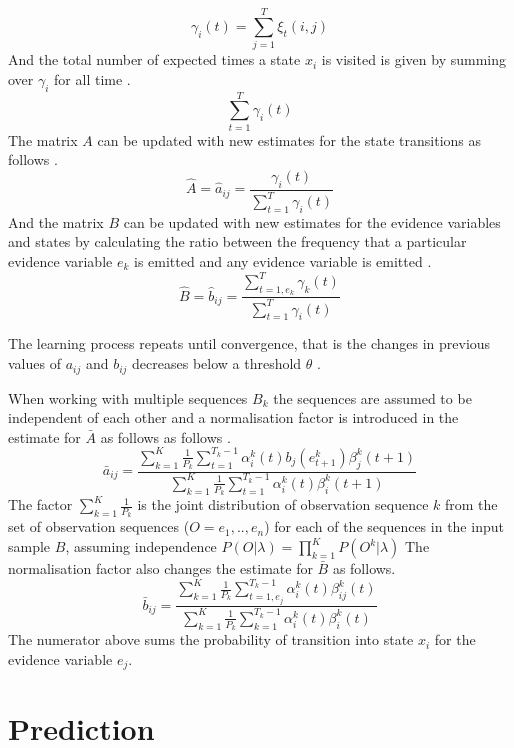 \documentclass[11pt]{article}
\begin{document}
$$
\gamma_i(t) = \sum_{j=1}^T \xi_t(i,j)
$$
And the total number of expected times a state $x_i$ is visited is given by summing over $\gamma_i$ for all time \cite{pc} \cite{rab}.
$$
\sum_{t=1}^T \gamma_i(t)
$$
The matrix $A$ can be updated with new estimates for the state transitions as follows \cite{pc}.
$$
\hat{A} = \hat{a}_{ij} = \frac{\gamma_i(t) }{\sum_{t=1}^T \gamma_i(t)}
$$
And the matrix $B$ can be updated with new estimates for the evidence variables and states by calculating the ratio between the frequency that a particular evidence variable $e_k$ is emitted and any evidence variable is emitted \cite{pc}.
$$
\hat{B} = \hat{b}_{ij} = \frac{\sum_{t=1, e_k}^T \gamma_k(t)}{\sum_{t=1}^T \gamma_i(t)}
$$ 

The learning process repeats until convergence, that is the changes in previous values of $a_{ij}$ and $b_{ij}$ decreases below a threshold $\theta$ \cite{pc}. 


When working with multiple sequences $B_k$ the sequences are assumed to be independent of each other and a normalisation factor is introduced in the estimate for $\bar{A}$ as follows as follows \cite{rab}.
$$
\bar{a}_{ij} = \frac{ \sum_{k=1}^K \frac{1}{P_k} \sum_{t=1}^{T_k - 1} \alpha_i^k(t)b_j(e_{t+1}^k)\beta_j^k(t+1)}{\sum_{k=1}^K \frac{1}{P_k} \sum_{t=1}^{T_k - 1} \alpha_i^k(t)\beta_i^k(t+1)}
$$
The factor $\sum_{k=1}^K \frac{1}{P_k}$ is the joint distribution of observation sequence $k$ from the set of observation sequences ($O = e_1,..,e_n$) for each of the sequences in the input sample $B$, assuming independence $P(O|\lambda) = \prod_{k=1}^K P(O^k|\lambda)$
The normalisation factor also changes the estimate for $\bar{B}$ as follows.
$$
\bar{b}_{ij} = \frac{\sum_{k=1}^K \frac{1}{P_k} \sum_{t=1, e_j}^{T_k - 1} \alpha_i^k(t) \beta_{ij}^k(t) }{\sum_{k=1}^K \frac{1}{P_k} \sum_{k=1}^{T_k - 1} \alpha_i^k(t)\beta_i^k(t) }
$$
The numerator above sums the probability of transition into state $x_i$ for the evidence variable $e_j$. 

\section{Prediction}
\end{document}
